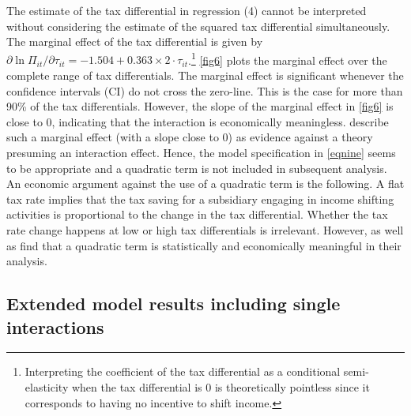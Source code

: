 \documentclass[10pt,twocolumn,oneside,cmyk]{article}
\begin{document}
The estimate of the tax differential in regression (4) cannot be interpreted without considering the estimate of the squared tax differential simultaneously. The marginal effect of the tax differential is given by $\partial \ln \Pi_{it}/\partial \tau_{it}=-1.504 + 0.363\times 2 \cdot \tau_{it}$.\footnote{Interpreting the coefficient of the tax differential as a conditional semi-elasticity when the tax differential is 0 is theoretically pointless since it corresponds to having no incentive to shift income.} \cref{fig6} plots the marginal effect over the complete range of tax differentials. The marginal effect is significant whenever the confidence intervals (CI) do not cross the zero-line. This is the case for more than 90\% of the tax differentials. However, the slope of the marginal effect in \cref{fig6} is close to 0, indicating that the interaction is economically meaningless. \textcite[662]{berry_improving_2012} describe such a marginal effect (with a slope close to 0) as evidence against a theory presuming an interaction effect. Hence, the model specification in \cref{eqnine} seems to be appropriate and a quadratic term is not included in subsequent analysis. An economic argument against the use of a quadratic term is the following. A flat tax rate implies that the tax saving for a subsidiary engaging in income shifting activities is proportional to the change in the tax differential. Whether the tax rate change happens at low or high tax differentials is irrelevant. However, \textcite[163]{hines_fiscal_1994} as well as \textcite[6, 8]{dowd_profit_2017} find that a quadratic term is statistically and economically meaningful in their analysis.

\subsection{Extended model results including single interactions} \label{sec:Extended model results including single interactions}
\end{document}
